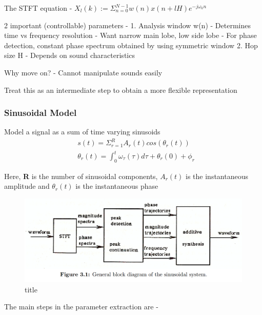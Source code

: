 \documentclass[11pt]{article}
\makeatletter
\def\maxwidth{\ifdim\Gin@nat@width>\linewidth\linewidth
    \else\Gin@nat@width\fi}
\let\Oldincludegraphics\includegraphics
\renewcommand{\includegraphics}[1]{\Oldincludegraphics[width=.8\maxwidth]{#1}}
\makeatother
\begin{document}
    The STFT equation -
\(X_{l}(k) := \Sigma_{n=0}^{N-1} w(n)x(n+lH)e^{-j\omega_{k}n}\)

    2 important (controllable) parameters - 1. Analysis window w(n) -
Determines time vs frequency resolution - Want narrow main lobe, low
side lobe - For phase detection, constant phase spectrum obtained by
using symmetric window 2. Hop size H - Depends on sound characteristics

    Why move on? - Cannot manipulate sounds easily

Treat this as an intermediate step to obtain a more flexible
representation

    \subsubsection{Sinusoidal Model}\label{sinusoidal-model}

    Model a signal as a sum of time varying sinusoids\\

\begin{align}
&s(t) = \Sigma_{r=1}^{R} A_{r}(t) cos(\theta_{r}(t))\\
&\theta_{r}(t) = \int_{0}^{t} \omega_{\tau}(\tau)d \tau + \theta_{r}(0) + \phi_{r}
\end{align}

Here, \textbf{R} is the number of sinusoidal components,
\textbf{\(A_{r}(t)\)} is the instantaneous amplitude and
\textbf{\(\theta_{r}(t)\)} is the instantaneous phase

    \begin{figure}
\centering
\includegraphics{fig_2.png}
\caption{title}
\end{figure}

    The main steps in the parameter extraction are -
\end{document}
